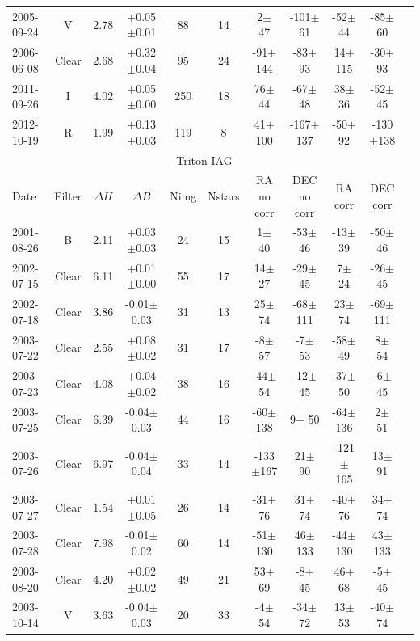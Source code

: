 \documentclass[12pt,a4paper]{report}
\begin{document}
\begin{landscape}
\begin{longtable}{|l|c|c|c|c|c|c|c|c|c|c|}
2005-09-24 & V     & 2.78 & +0.05$\pm$0.01 &  88 &  14 &    2$\pm$ 47 & -101$\pm$ 61 &  -52$\pm$ 44 &  -85$\pm$ 60 \\ 
2006-06-08 & Clear & 2.68 & +0.32$\pm$0.04 &  95 &  24 &  -91$\pm$144 &  -83$\pm$ 93 &   14$\pm$115 &  -30$\pm$ 93 \\ 
2011-09-26 & I     & 4.02 & +0.05$\pm$0.00 & 250 &  18 &   76$\pm$ 44 &  -67$\pm$ 48 &   38$\pm$ 36 &  -52$\pm$ 45 \\ 
2012-10-19 & R     & 1.99 & +0.13$\pm$0.03 & 119 &   8 &   41$\pm$100 & -167$\pm$137 &  -50$\pm$ 92 & -130$\pm$138 \\ 
\hline
\multicolumn{10}{|c|}{Triton-IAG}\\
Date & Filter & $\Delta H$ & $\Delta B$ & Nimg & Nstars & RA no corr & DEC no corr & RA corr & DEC corr \\
\hline
2001-08-26 & B     & 2.11 & +0.03$\pm$0.03 &  24 &  15 &    1$\pm$ 40 &  -53$\pm$ 46 &  -13$\pm$ 39 &  -50$\pm$ 46 \\ 
2002-07-15 & Clear & 6.11 & +0.01$\pm$0.00 &  55 &  17 &   14$\pm$ 27 &  -29$\pm$ 45 &    7$\pm$ 24 &  -26$\pm$ 45 \\ 
2002-07-18 & Clear & 3.86 & -0.01$\pm$0.03 &  31 &  13 &   25$\pm$ 74 &  -68$\pm$111 &   23$\pm$ 74 &  -69$\pm$111 \\ 
2003-07-22 & Clear & 2.55 & +0.08$\pm$0.02 &  31 &  17 &   -8$\pm$ 57 &   -7$\pm$ 53 &  -58$\pm$ 49 &    8$\pm$ 54 \\ 
2003-07-23 & Clear & 4.08 & +0.04$\pm$0.02 &  38 &  16 &  -44$\pm$ 54 &  -12$\pm$ 45 &  -37$\pm$ 50 &   -6$\pm$ 45 \\ 
2003-07-25 & Clear & 6.39 & -0.04$\pm$0.03 &  44 &  16 &  -60$\pm$138 &    9$\pm$ 50 &  -64$\pm$136 &    2$\pm$ 51 \\ 
2003-07-26 & Clear & 6.97 & -0.04$\pm$0.04 &  33 &  14 & -133$\pm$167 &   21$\pm$ 90 & -121$\pm$165 &   13$\pm$ 91 \\ 
2003-07-27 & Clear & 1.54 & +0.01$\pm$0.05 &  26 &  14 &  -31$\pm$ 76 &   31$\pm$ 74 &  -40$\pm$ 76 &   34$\pm$ 74 \\ 
2003-07-28 & Clear & 7.98 & -0.01$\pm$0.02 &  60 &  14 &  -51$\pm$130 &   46$\pm$133 &  -44$\pm$130 &   43$\pm$133 \\ 
2003-08-20 & Clear & 4.20 & +0.02$\pm$0.02 &  49 &  21 &   53$\pm$ 69 &   -8$\pm$ 45 &   46$\pm$ 68 &   -5$\pm$ 45 \\ 
2003-10-14 & V     & 3.63 & -0.04$\pm$0.03 &  20 &  33 &   -4$\pm$ 54 &  -34$\pm$ 72 &   13$\pm$ 53 &  -40$\pm$ 74 \\ 

\end{longtable}
\end{landscape}
\end{document}
